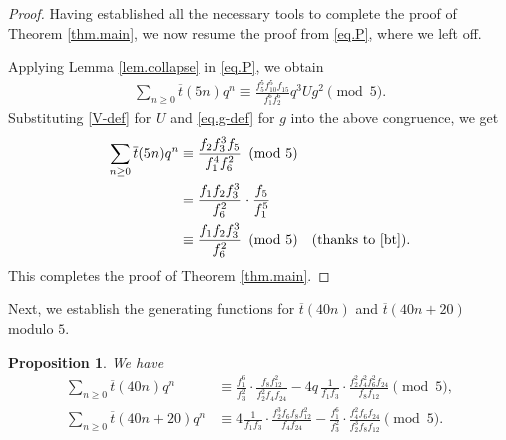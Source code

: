 \documentclass{amsart}
\newtheorem{proposition}[theorem]{Proposition}
\theoremstyle{definition}
\newcommand{\tbar}{\overline{t}}
\begin{document}
\begin{proof}
Having established all the necessary tools to complete the proof of Theorem \ref{thm.main}, we now resume the proof from \eqref{eq.P}, where we left off. 

Applying Lemma \ref{lem.collapse} in \eqref{eq.P}, we obtain
\begin{align*}
\sum_{n\geq0}\tbar(5n)q^n
\equiv \frac{f_5^{5}f_{10}^{5}f_{15}}{f_1^{6}f_2^{6}}q^3U g^2 \pmod 5.
\end{align*}
Substituting \eqref{V-def} for $U$ and \eqref{eq.g-def} for $g$ into the above congruence, we get
\begin{align*}
    \sum_{n\geq0}\tbar(5n)q^n
&\equiv \frac{f_2f_3^{3}f_5}{f_1^{4}f_6^{2}} \pmod 5\\
&=\frac{f_1f_2f_3^3}{f_6^2}\cdot\frac{f_5}{f_1^5}\\
&\equiv \frac{f_1f_2f_3^3}{f_6^2} \pmod 5 \quad \text{(thanks to \eqref{bt})}.
\end{align*}
This completes the proof of Theorem \ref{thm.main}.
\end{proof}
Next, we establish the generating functions for $\tbar(40n)$ and $\tbar{(40n+20)}$ modulo $5$.
\begin{proposition}\label{prop.40n}
We have
\begin{align}
\sum_{n\ge0}\tbar(40n)q^{n}
&\equiv\frac{f_1^{6}}{f_3^{2}}\cdot\frac{f_8f_{12}^{2}}{f_2^{2}f_4f_{24}}
-4q\,\frac1{f_1f_3}\cdot\frac{f_2^{2}f_4^{2}f_6^{2}f_{24}}{f_8f_{12}} \pmod 5
\label{eq.40n},\\
\sum_{n\ge0}\tbar(40n+20)q^{n}
&\equiv4\frac1{f_1f_3}\cdot\frac{f_2^{3}f_6f_8f_{12}^{2}}{f_4f_{24}}
-\frac{f_1^{6}}{f_3^{2}}\cdot\frac{f_4^{2}f_6f_{24}}{f_2^{3}f_8f_{12}}
\pmod5.
\label{eq.40n20}
\end{align}
\end{proposition}
\end{document}
